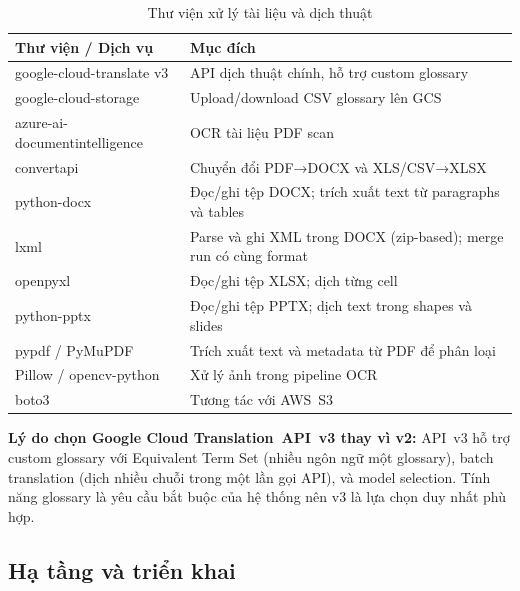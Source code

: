 \begin{table}[H]
\centering
\caption{Thư viện xử lý tài liệu và dịch thuật}
\label{tab:tech_translate}
\renewcommand{\arraystretch}{1.3}
\begin{tabularx}{\textwidth}{|l|X|}
\hline
\textbf{Thư viện / Dịch vụ}   & \textbf{Mục đích} \\
\hline
google-cloud-translate v3     & API dịch thuật chính, hỗ trợ custom glossary \\
\hline
google-cloud-storage          & Upload/download CSV glossary lên GCS \\
\hline
azure-ai-documentintelligence & OCR tài liệu PDF scan \\
\hline
convertapi                    & Chuyển đổi PDF→DOCX và XLS/CSV→XLSX \\
\hline
python-docx                   & Đọc/ghi tệp DOCX; trích xuất text từ paragraphs và tables \\
\hline
lxml                          & Parse và ghi XML trong DOCX (zip-based); merge run có cùng format \\
\hline
openpyxl                      & Đọc/ghi tệp XLSX; dịch từng cell \\
\hline
python-pptx                   & Đọc/ghi tệp PPTX; dịch text trong shapes và slides \\
\hline
pypdf / PyMuPDF               & Trích xuất text và metadata từ PDF để phân loại \\
\hline
Pillow / opencv-python        & Xử lý ảnh trong pipeline OCR \\
\hline
boto3                         & Tương tác với AWS~S3 \\
\hline
\end{tabularx}
\end{table}

\textbf{Lý do chọn Google Cloud Translation~API~v3 thay vì v2:}
API~v3 hỗ trợ custom glossary với Equivalent Term Set (nhiều ngôn ngữ một glossary), batch
translation (dịch nhiều chuỗi trong một lần gọi API), và model selection. Tính năng glossary là
yêu cầu bắt buộc của hệ thống nên v3 là lựa chọn duy nhất phù hợp.

\subsection{Hạ tầng và triển khai}

